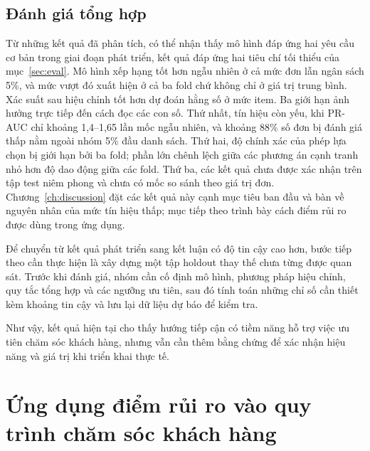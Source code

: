 \documentclass[12pt,a4paper]{report}
\begin{document}
\subsection{Đánh giá tổng hợp}\label{sec:analysis-summary}

Từ những kết quả đã phân tích, có thể nhận thấy mô hình đáp ứng hai yêu cầu cơ bản trong giai đoạn phát triển, kết quả đáp ứng hai tiêu chí tối thiểu của mục~\ref{sec:eval}. Mô hình xếp hạng tốt hơn ngẫu nhiên ở cả mức đơn lẫn ngân sách 5\%, và mức vượt đó xuất hiện ở cả ba fold chứ không chỉ ở giá trị trung bình. Xác suất sau hiệu chỉnh tốt hơn dự đoán hằng số ở mức item. Ba giới hạn ảnh hưởng trực tiếp đến cách đọc các con số. Thứ nhất, tín hiệu còn yếu, khi PR-AUC chỉ khoảng 1,4--1,65 lần mốc ngẫu nhiên, và khoảng 88\% số đơn bị đánh giá thấp nằm ngoài nhóm 5\% đầu danh sách. Thứ hai, độ chính xác của phép lựa chọn bị giới hạn bởi ba fold; phần lớn chênh lệch giữa các phương án cạnh tranh nhỏ hơn độ dao động giữa các fold. Thứ ba, các kết quả chưa được xác nhận trên tập test niêm phong và chưa có mốc so sánh theo giá trị đơn. Chương~\ref{ch:discussion} đặt các kết quả này cạnh mục tiêu ban đầu và bàn về nguyên nhân của mức tín hiệu thấp; mục tiếp theo trình bày cách điểm rủi ro được dùng trong ứng dụng.

Để chuyển từ kết quả phát triển sang kết luận có độ tin cậy cao hơn, bước tiếp theo cần thực hiện là xây dựng một tập holdout thay thế chưa từng được quan sát. Trước khi đánh giá, nhóm cần cố định mô hình, phương pháp hiệu chỉnh, quy tắc tổng hợp và các ngưỡng ưu tiên, sau đó tính toán những chỉ số cần thiết kèm khoảng tin cậy và lưu lại dữ liệu dự báo để kiểm tra.

Như vậy, kết quả hiện tại cho thấy hướng tiếp cận có tiềm năng hỗ trợ việc ưu tiên chăm sóc khách hàng, nhưng vẫn cần thêm bằng chứng để xác nhận hiệu năng và giá trị khi triển khai thực tế.

\section{Ứng dụng điểm rủi ro vào quy trình chăm sóc khách hàng}\label{sec:demo}
\end{document}
